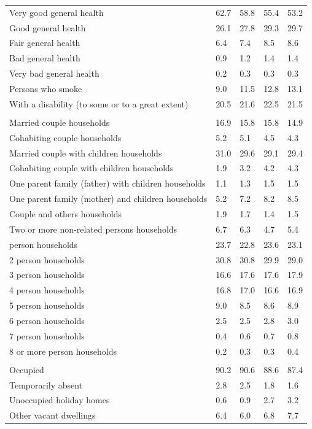 \documentclass{article}
\begin{document}
\begin{table}[h]
\begin{tabular}{KTTTT}
    \hline
Very good general health & 62.7& 58.8&55.4& 53.2\\
Good general health & 26.1& 27.8& 29.3& 29.7\\
Fair general health & 6.4& 7.4&8.5& 8.6\\
Bad general health & 0.9& 1.2&1.4& 1.4\\
Very bad general health & 0.2& 0.3&0.3& 0.3\\
    \hline
Persons who smoke &  9.0& 11.5&12.8& 13.1\\
    \hline
With a disability (to some or to a great extent) & 20.5& 21.6&22.5& 21.5\\
\hline
    \\ 
    \hline
Married couple households & 16.9& 15.8& 15.8& 14.9\\
Cohabiting couple households & 5.2& 5.1& 4.5& 4.3\\
Married couple with children households & 31.0& 29.6& 29.1& 29.4\\
Cohabiting couple with children households & 1.9& 3.2& 4.2& 4.3\\
One parent family (father) with  children households & 1.1& 1.3& 1.5& 1.5\\
One parent family (mother) and children households & 5.2& 7.2& 8.2& 8.5\\
Couple and others households  & 1.9& 1.7& 1.4& 1.5\\
Two or more non-related persons households & 6.7& 6.3& 4.7& 5.4\\
     person households & 23.7& 22.8& 23.6& 23.1\\
2 person households & 30.8& 30.8& 29.9& 29.0\\
3 person households & 16.6& 17.6& 17.6& 17.9\\
4 person households & 16.8& 17.0& 16.6& 16.9\\
5 person households & 9.0& 8.5& 8.6& 8.9\\
6 person households & 2.5& 2.5& 2.8& 3.0\\
7 person households & 0.4& 0.6& 0.7& 0.8\\
8 or more person households & 0.2& 0.3& 0.3& 0.4\\
\hline
    \\ 
    \hline
Occupied & 90.2& 90.6& 88.6& 87.4\\
Temporarily absent & 2.8& 2.5& 1.8& 1.6\\
Unoccupied holiday homes & 0.6& 0.9& 2.7& 3.2\\
Other vacant dwellings & 6.4& 6.0& 6.8& 7.7\\
\hline
\end{tabular}
\end{table}
\end{document}
